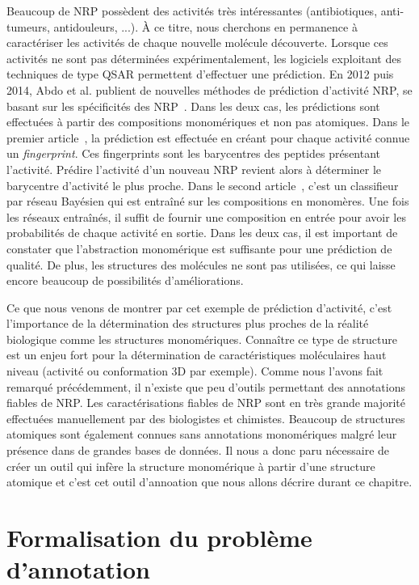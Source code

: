 Beaucoup de NRP possèdent des activités très intéressantes (antibiotiques, anti-tumeurs, antidouleurs, ...).
À ce titre, nous cherchons en permanence à caractériser les activités de chaque nouvelle molécule découverte.
Lorsque ces activités ne sont pas déterminées expérimentalement, les logiciels exploitant des techniques de type QSAR permettent d'effectuer une prédiction.
En 2012 puis 2014, Abdo et al. publient de nouvelles méthodes de prédiction d'activité NRP, se basant sur les spécificités des NRP~\cite{abdo_new_2012, abdo_prediction_2014}.
Dans les deux cas, les prédictions sont effectuées à partir des compositions monomériques et non pas atomiques.
Dans le premier article~\cite{abdo_new_2012}, la prédiction est effectuée en créant pour chaque activité connue un \textit{fingerprint}.
Ces fingerprints sont les barycentres des peptides présentant l'activité.
Prédire l'activité d'un nouveau NRP revient alors à déterminer le barycentre d'activité le plus proche.
Dans le second article~\cite{abdo_prediction_2014}, c'est un classifieur par réseau Bayésien qui est entraîné sur les compositions en monomères.
Une fois les réseaux entraînés, il suffit de fournir une composition en entrée pour avoir les probabilités de chaque activité en sortie.
Dans les deux cas, il est important de constater que l'abstraction monomérique est suffisante pour une prédiction de qualité.
De plus, les structures des molécules ne sont pas utilisées, ce qui laisse encore beaucoup de possibilités d'améliorations.

Ce que nous venons de montrer par cet exemple de prédiction d'activité, c'est l'importance de la détermination des structures plus proches de la réalité biologique comme les structures monomériques.
Connaître ce type de structure est un enjeu fort pour la détermination de caractéristiques moléculaires haut niveau (activité ou conformation 3D par exemple).
Comme nous l'avons fait remarqué précédemment, il n'existe que peu d'outils permettant des annotations fiables de NRP.
Les caractérisations fiables de NRP sont en très grande majorité effectuées manuellement par des biologistes et chimistes.
Beaucoup de structures atomiques sont également connues sans annotations monomériques malgré leur présence dans de grandes bases de données.
Il nous a donc paru nécessaire de créer un outil qui infère la structure monomérique à partir d'une structure atomique et c'est cet outil d'annoation que nous allons décrire durant ce chapitre.




\section{Formalisation du problème d'annotation}

